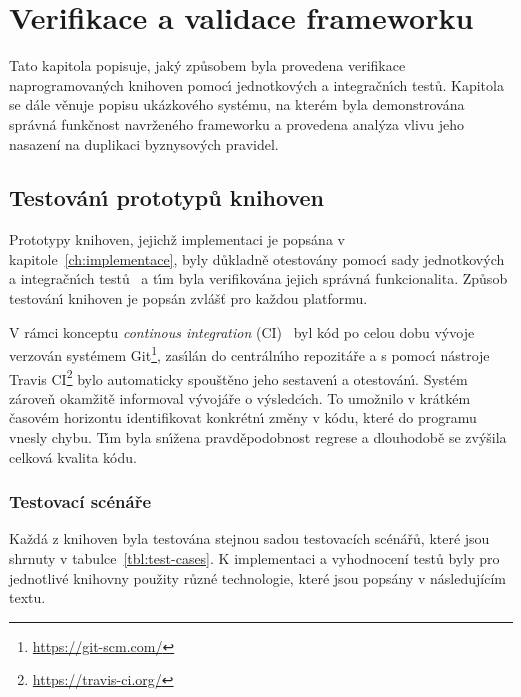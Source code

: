 

\chapter{Verifikace a validace frameworku}\label{ch:verifikace}

Tato kapitola popisuje, jak\'y způsobem byla provedena
verifikace naprogramovan\'ych knihoven pomoc\'{\i}
jednotkov\'ych a integračn\'{\i}ch testů.
Kapitola se dále věnuje popisu ukázkového systému, na kterém
byla demonstrována správná funkčnost navrženého frameworku
a provedena analýza vlivu jeho nasazení na duplikaci
byznysových pravidel.

\section{Testován\'{\i} prototypů knihoven}

Prototypy knihoven, jejichž implementaci je popsána v kapitole~\ref{ch:implementace},
byly důkladně otestovány pomoc\'{\i} sady jednotkov\'ych a integračn\'{\i}ch testů~\cite{luo2001software}
a t\'{\i}m byla verifikována jejich správná funkcionalita. Způsob
testován\'{\i} knihoven je popsán zvlášť pro každou platformu.

V rámci konceptu \textit{continous integration} (\gls{CI})~\cite{fowler2006continuous}
byl kód po celou dobu v\'yvoje verzován systémem Git\footnote{\url{https://git-scm.com/}},
zas\'{\i}lán do centráln\'{\i}ho repozitáře a s pomoc\'{\i}
nástroje Travis \gls{CI}\footnote{\url{https://travis-ci.org/}}
bylo automaticky spouštěno jeho sestaven\'{\i} a otestován\'{\i}.
Systém zároveň okamžitě informoval v\'yvojáře o v\'ysledc\'{\i}ch.
To umožnilo v krátkém časovém horizontu identifikovat konkrétn\'{\i} změny
v kódu, které do programu vnesly chybu. T\'{\i}m byla sn\'{\i}žena
pravděpodobnost regrese a dlouhodobě se zv\'yšila celková kvalita kódu.

\subsection{Testovací scénáře}

Každá z knihoven byla testována stejnou sadou testovacích scénářů, které jsou shrnuty
v tabulce~\ref{tbl:test-cases}. K implementaci a vyhodnocení testů byly pro jednotlivé
knihovny použity různé technologie, které jsou popsány v následujícím textu.

